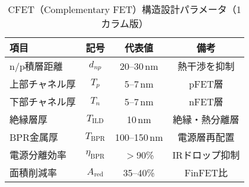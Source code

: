 \begin{table}[t]
  \centering
  \caption{CFET（Complementary FET）構造設計パラメータ（1カラム版）}
  \label{tab:cfet_stack}
  \setlength{\tabcolsep}{2.3pt}     %
  \renewcommand{\arraystretch}{1.05} %
  \footnotesize
  \begin{tabular}{lccc}
    \toprule
    項目 & 記号 & 代表値 & 備考 \\
    \midrule
    n/p積層距離 & $d_{np}$ & 20--30\,nm & 熱干渉を抑制 \\
    上部チャネル厚 & $T_p$ & 5--7\,nm & pFET層 \\
    下部チャネル厚 & $T_n$ & 5--7\,nm & nFET層 \\
    絶縁層厚 & $T_\mathrm{ILD}$ & 10\,nm & 絶縁・熱分離層 \\
    BPR金属厚 & $T_\mathrm{BPR}$ & 100--150\,nm & 電源層再配置 \\
    電源分離効率 & $\eta_\mathrm{BPR}$ & $>$90\% & IRドロップ抑制 \\
    面積削減率 & $A_\mathrm{red}$ & 35--40\% & FinFET比 \\
    \bottomrule
  \end{tabular}
\end{table}
